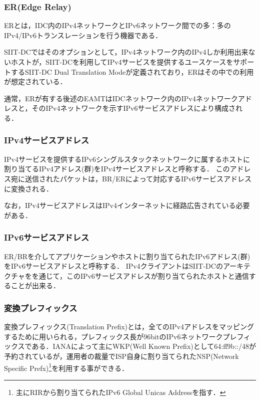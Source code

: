 \subsubsection{ER(Edge Relay)}
ERとは，IDC内のIPv4ネットワークとIPv6ネットワーク間での多：多のIPv4/IPv6トランスレーションを行う機器である．

SIIT-DCではそのオプションとして，IPv4ネットワーク内のIPv4しか利用出来ないホストが，SIIT-DCを利用してIPv4サービスを提供するユースケースをサポートするSIIT-DC Dual Translation Mode\cite{RFC7756}が定義されており，ERはその中での利用が想定されている．

通常，ERが有する後述のEAMTはIDCネットワーク内のIPv4ネットワークアドレスと，そのIPv4ネットワークを示すIPv6サービスアドレスにより構成される．

\subsubsection{IPv4サービスアドレス}
IPv4サービスを提供するIPv6シングルスタックネットワークに属するホストに割り当てるIPv4アドレス(群)をIPv4サービスアドレスと呼称する．
このアドレス宛に送信されたパケットは，BR/ERによって対応するIPv6サービスアドレスに変換される．

なお，IPv4サービスアドレスはIPv4インターネットに経路広告されている必要がある．

\subsubsection{IPv6サービスアドレス}
ER/BRを介してアプリケーションやホストに割り当てられたIPv6アドレス(群)をIPv6サービスアドレスと呼称する．
IPv4クライアントはSIIT-DCのアーキテクチャをを通じて，このIPv6サービスアドレスが割り当てられたホストと通信することが出来る．

\subsubsection{変換プレフィックス}
\label{issue:siit-dc:translation-prefix}
 
変換プレフィックス(Translation Prefix)とは，全てのIPv4アドレスをマッピングするために用いられる，プレフィックス長が96bitのIPv6ネットワークプレフィックスである\cite{RFC6052}．IANAによって主にWKP(Well Known Prefix)として64:ff9b::/48が予約\cite{RFC8215,IANA_allocation_v6}されているが，運用者の裁量でISP自身に割り当てられたNSP(Network Specific Prefx)\footnote{主にRIRから割り当てられたIPv6 Global Unicas Addressを指す．}を利用する事ができる．

